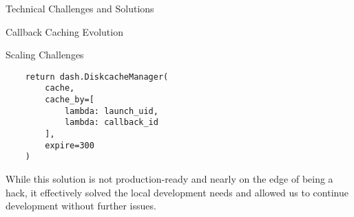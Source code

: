\begin{section}{Technical Challenges and Solutions}
\begin{subsection}{Callback Caching Evolution}
\begin{subsubsection}{Scaling Challenges}
\begin{listing}[H]
\begin{verbatim}
    return dash.DiskcacheManager(
        cache,
        cache_by=[
            lambda: launch_uid,
            lambda: callback_id
        ],
        expire=300
    )
				\end{verbatim}
				\label{lst:dashboard-implementation-cache-final}
			\end{listing}

			While this solution is not production-ready and nearly on the edge of being a hack, it effectively solved the local development needs and allowed us to continue development without further issues.
		\end{subsubsection}
	\end{subsection}
\end{section}

